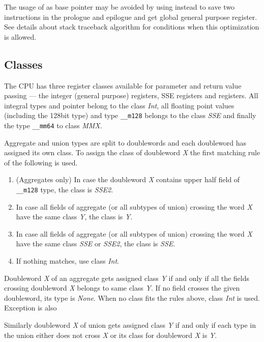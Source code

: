 The usage of \RBP{} as base pointer may be avoided by using \RSP{} instead
to save two instructions in the prologue and epilogue and get global general
purpose register.  See details about stack traceback algorithm for conditions
when this optimization is allowed.

\subsection{Classes}

The \xARCH CPU has three register classes available for parameter and
return value passing --- the integer (general purpose)
registers, SSE registers and \MMX{} registers.  All integral types and
pointer belong to the class \emph{Int}, all floating point values
(including the 128bit type) and type \verb|__m128| belongs to the class
\emph{SSE} and finally the type \verb|__mm64| to class \emph{MMX}.

Aggregate and union types are split to doublewords and each doubleword has
assigned its own class. To assign the class of doubleword \emph{X} the
first matching rule of the following is used.
\begin{enumerate}
  \item (Aggregates only) In case the doubleword \emph{X} contains upper half field of
    \verb|__m128| type, the class is \emph{SSE2}.

  \item In case all fields of aggregate (or all subtypes of union) crossing the
    word \emph{X} have the same class \emph{Y}, the class is \emph{Y}.

  \item In case all fields of aggregate (or all subtypes of union) crossing the
    word \emph{X} have the same class \emph{SSE} or \emph{SSE2}, the class
    is \emph{SSE}.

  \item If nothing matches, use class \emph{Int}.
\end{enumerate}

Doubleword \emph{X} of an aggregate gets assigned class \emph{Y} if and only
if all the fields crossing doubleword \emph{X} belongs to same class \emph{Y}.  If
no field crosses the given doubleword, its type is \emph{None}. When no class fits
the rules above, class \emph{Int} is used.  Exception is also 

Similarly doubleword \emph{X} of union gets assigned class \emph{Y} if and only if
each type in the union either does not cross \emph{X} or its class for doubleword
\emph{X} is \emph{Y}.

